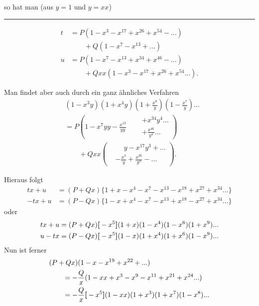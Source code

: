 \noindent so hat man (aus $y=1$ und $y=xx$)
\par\smallskip\noindent\rule{.25\linewidth}{.4pt}\par
{\small\par{}\par}
\clearpage
{}
\[\begin{aligned}
t&=P(1-x^3-x^{17}+x^{26}+x^{54}-{.}{.}{.})\\
&\qquad+Q(1-x^7-x^{13}+{.}{.}{.})\\[.8ex]
u&=P(1-x^7-x^{13}+x^{34}+x^{46}-{.}{.}{.})\\
&\qquad+Qxx(1-x^3-x^{17}+x^{26}+x^{54}{.}{.}{.}).
\end{aligned}\]
\ClosingRule
\par\indent Man findet aber auch durch ein ganz ähnliches Verfahren
\[\begin{aligned}
&(1-x^3y)(1+x^4y)\left(1+\frac{x^6}{y}\right)\left(1-\frac{x^7}{y}\right){.}{.}{.}\\
&=P\left(1-x^7yy-\frac{x^{13}}{yy}\quad\begin{aligned}
&+x^{34}y^4{.}{.}{.}\\
&+\frac{x^{46}}{y^4}{.}{.}{.}
\end{aligned}\right)\\[1ex]
&\qquad+Qxx\left(\begin{aligned}
&\phantom{{}-{}}y-x^{17}y^3+{.}{.}{.}\\
&-\frac{x^3}{y}+\frac{x^{26}}{y^3}-{.}{.}{.}
\end{aligned}\right).
\end{aligned}\]
\ClosingRule
\par\indent Hieraus folgt
\[\begin{aligned}
tx+u&=(P+Qx)\{1+x-x^4-x^7-x^{13}-x^{18}+x^{27}+x^{34}{.}{.}{.}\}\\
-tx+u&=(P-Qx)\{1-x+x^4-x^7-x^{13}+x^{18}-x^{27}+x^{34}{.}{.}{.}\}
\end{aligned}\]
\noindent oder
\[\begin{aligned}
tx+u&=(P+Qx)\boldsymbol{[}-x^5\boldsymbol{]}(1+x)(1-x^4)(1-x^6)(1+x^9){.}{.}{.}\\
u-tx&=(P-Qx)\boldsymbol{[}-x^5\boldsymbol{]}(1-x)(1+x^4)(1+x^6)(1-x^9){.}{.}{.}
\end{aligned}\]
\noindent Nun ist ferner
\[\begin{aligned}
&(P+Qx)(1-x-x^{19}+x^{22}+{.}{.}{.})\\
&\qquad=-\frac Qx(1-xx+x^3-x^9-x^{11}+x^{21}+x^{24}{.}{.}{.})\\
&\qquad=-\frac Qx\boldsymbol{[}-x^5\boldsymbol{]}(1-xx)(1+x^3)(1+x^7)(1-x^8){.}{.}{.}
\end{aligned}\]
